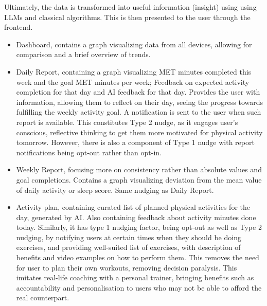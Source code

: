 Ultimately, the data is transformed into useful information (insight) using using LLMs and classical algorithms. This is then presented to the user through the frontend. 
\begin{itemize}
    \item {Dashboard, contains a graph visualizing data from all devices, allowing for comparison and a brief overview of trends.}
    \item {Daily Report, containing a graph visualizing MET minutes completed this week and the goal MET minutes per week; Feedback on expected activity completion for that day and AI feedback for that day. Provides the user with information, allowing them to reflect on their day, seeing the progress towards fulfilling the weekly activity goal. A notification is sent to the user when such report is available. This constitutes Type 2 nudge, as it  engages user's conscious, reflective thinking to get them more motivated for physical activity tomorrow. However, there is also a component of Type 1 nudge with report notifications being opt-out rather than opt-in.}
    \item {Weekly Report, focusing more on consistency rather than absolute values and goal completions. Contains a graph visualizing deviation from the mean value of daily activity or sleep score. Same nudging as Daily Report.}
    \item {Activity plan, containing curated list of planned physical activities for the day, generated by AI. Also containing feedback about activity minutes done today. Similarly, it has type 1 nudging factor, being opt-out as well as Type 2 nudging, by notifying users at certain times when they should be doing exercises, and providing well-suited list of exercises, with description of benefits and video examples on how to perform them. This removes the need for user to plan their own workouts, removing decision paralysis. This imitates real-life coaching with a personal trainer, bringing benefits such as accountability and personalisation to users who may not be able to afford the real counterpart.}
\end{itemize}

